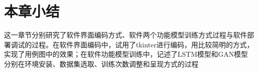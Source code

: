 \section{本章小结}
这一章节分别研究了软件界面编码方式、软件两个功能模型训练方式过程与软件部署调试的过程。在软件界面编码中，试用了tkinter进行编码，用比较简明的方式，实现了用例图中的效果；在软件功能模型训练中，记述了LSTM模型和GAN模型分别在环境安装、数据集选取、训练次数调整和呈现方式的过程




